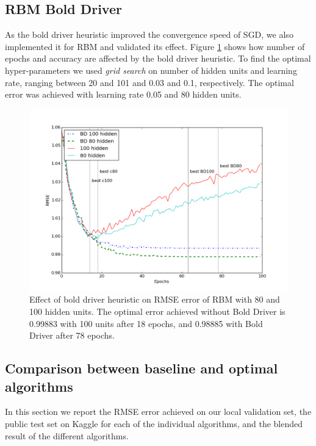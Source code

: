 \documentclass[10pt,conference,compsocconf]{IEEEtran}
\begin{document}
	\subsection{RBM Bold Driver}
	As the bold driver heuristic improved the convergence speed of SGD, we also implemented it for RBM and validated its effect. Figure \ref{fig:rbm-conv-zoom} shows how number of epochs and accuracy are affected by the bold driver heuristic. To find the optimal hyper-parameters we used \emph{grid search} on number of hidden units and learning rate, ranging between 20 and 101 and 0.03 and 0.1, respectively. The optimal error was achieved with learning rate 0.05 and 80 hidden units.
	
	
	
	\begin{figure}[htbp]
		\centering
		\includegraphics[scale=0.25]{conv_rbm_all.png}
		\caption{Effect of bold driver heuristic on RMSE error of RBM with 80 and 100 hidden units. The optimal error achieved without Bold Driver is 0.99883 with 100 units after 18 epochs, and 0.98885 with Bold Driver after 78 epochs.}
		\label{fig:rbm-conv-zoom}
	\end{figure} 
	
	\subsection{Comparison between baseline and optimal algorithms}
	In this section we report the RMSE error achieved on our local validation set, the public test set on Kaggle for each of the individual algorithms, and the blended result of the different algorithms.
	
\end{document}
